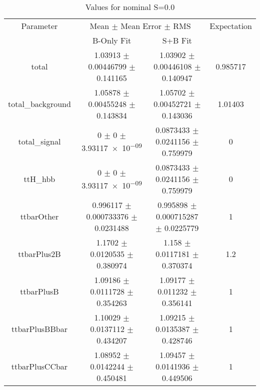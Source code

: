 \begin{table}
\centering
\caption{Values for nominal S=0.0}
\begin{tabular}{cccc}
\toprule
Parameter & \multicolumn{2}{c}{Mean $\pm$ Mean Error $\pm$ RMS} & Expectation\\
 & B-Only Fit & S+B Fit & \\
\midrule
total & \num{1.03913} $\pm$ \num{0.00446799} $\pm$ \num{0.141165} & \num{1.03902} $\pm$ \num{0.00446108} $\pm$ \num{0.140947} & \num{0.985717}\\
total\_background & \num{1.05878} $\pm$ \num{0.00455248} $\pm$ \num{0.143834} & \num{1.05702} $\pm$ \num{0.00452721} $\pm$ \num{0.143036} & \num{1.01403}\\
total\_signal & \num{0} $\pm$ \num{0} $\pm$ \num{3.93117e-09} & \num{0.0873433} $\pm$ \num{0.0241156} $\pm$ \num{0.759979} & \num{0}\\
ttH\_hbb & \num{0} $\pm$ \num{0} $\pm$ \num{3.93117e-09} & \num{0.0873433} $\pm$ \num{0.0241156} $\pm$ \num{0.759979} & \num{0}\\
ttbarOther & \num{0.996117} $\pm$ \num{0.000733376} $\pm$ \num{0.0231488} & \num{0.995898} $\pm$ \num{0.000715287} $\pm$ \num{0.0225779} & \num{1}\\
ttbarPlus2B & \num{1.1702} $\pm$ \num{0.0120535} $\pm$ \num{0.380974} & \num{1.158} $\pm$ \num{0.0117181} $\pm$ \num{0.370374} & \num{1.2}\\
ttbarPlusB & \num{1.09186} $\pm$ \num{0.0111728} $\pm$ \num{0.354263} & \num{1.09177} $\pm$ \num{0.011232} $\pm$ \num{0.356141} & \num{1}\\
ttbarPlusBBbar & \num{1.10029} $\pm$ \num{0.0137112} $\pm$ \num{0.434207} & \num{1.09215} $\pm$ \num{0.0135387} $\pm$ \num{0.428746} & \num{1}\\
ttbarPlusCCbar & \num{1.08952} $\pm$ \num{0.0142244} $\pm$ \num{0.450481} & \num{1.09457} $\pm$ \num{0.0141936} $\pm$ \num{0.449506} & \num{1}\\
\bottomrule
\end{tabular}
\end{table}
